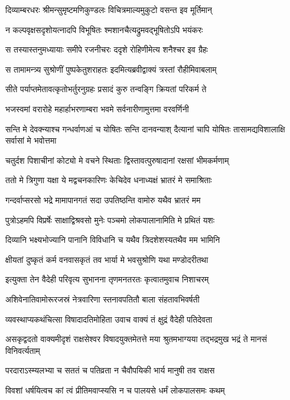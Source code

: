 \twolineshloka
{दिव्याम्बरधरः श्रीमन्सुमृष्टमणिकुण्डलः}
{विचित्रमाल्यमुकुटो वसन्त इव मूर्तिमान्}


\twolineshloka
{न कल्पवृक्षसदृशोयत्नादपि विभूषितः}
{श्मशानचैत्यद्रुमवद्भूषितोऽपि भयंकरः}


\twolineshloka
{स तस्यास्तनुमध्यायाः समीपे रजनीचरः}
{ददृशे रोहिणीमेत्य शनैश्चर इव ग्रैहः}


\twolineshloka
{स तामामन्त्र्य सुश्रोणीं पुष्पकेतुशराहतः}
{इदमित्यब्रवीद्वाक्यं त्रस्तां रौहीमिवाबलाम्}


\twolineshloka
{सीते पर्याप्तमेतावत्कृतोभर्तुरनुग्रहः}
{प्रसादं कुरु तन्वङ्गि क्रियतां परिकर्म ते}


\twolineshloka
{भजस्वमां वरारोहे महार्हाभरणाम्बरा}
{भवमे सर्वनारीणामुत्तमा वरवर्णिनी}


\threelineshloka
{सन्ति मे देवक्न्याश्च गन्धर्वाणआं च योषितः}
{सन्ति दानवन्याश् दैत्यानां चापि योषितः}
{तासामद्यविशालाक्षि सर्वासां मे भवोत्तमा}


\twolineshloka
{चतुर्दश पिशाचीनां कोट्यो मे वचने स्थिताः}
{द्विस्तावत्पुरुषादानां रक्षसां भीमकर्मणाम्}


\twolineshloka
{ततो मे त्रिगुणा यक्षा ये मद्वचनकारिणः}
{केचिदेव धनाध्यक्षं भ्रातरं मे समाश्रिताः}


\twolineshloka
{गन्दर्वाप्सरसो भद्रे मामापानगतं सदा}
{उपतिष्ठन्ति वामोरु यथैव भ्रातरं मम}


\twolineshloka
{पुत्रोऽहमपि विप्रर्षेः साक्षाद्विश्रवसो मुनेः}
{पञ्चमो लोकपालानामिति मे प्रथितं यशः}


\twolineshloka
{दिव्यानि भक्ष्यभोज्यानि पानानि विविधानि च}
{यथैव त्रिदशेशस्यतथैव मम भामिनि}


\twolineshloka
{क्षीयतां दुष्कृतं कर्म वनवासकृतं तव}
{भार्या मे भवसुश्रोणि यथा मण्डोदरीतथा}


\twolineshloka
{इत्युक्ता तेन वैदेही परिवृत्य सुभानना}
{तृणमनतरतः कृत्वातमुवाच निशाचरम्}


\twolineshloka
{अशिवेनातिवामोरूरजस्रं नेत्रवारिणा}
{स्तनावपतितौ बाला संहतावभिवर्षती}


\twolineshloka
{व्यवस्थाप्यकथंचित्सा विषादादतिमोहिता}
{उवाच वाक्यं तं क्षुद्रं वैदेही पतिदेवता}


\threelineshloka
{असकृद्वदतो वाक्यमीदृशं राक्षसेश्वर}
{विषादयुक्तमेतत्ते मया श्रुतमभाग्यया}
{तद्भद्रमुख भद्रं ते मानसं विनिवर्त्यताम्}


\twolineshloka
{परदाराऽस्म्यलभ्या च सततं च पतिव्रता}
{न चैवौपयिकी भार्य मानुषी तव राक्षस}


\twolineshloka
{विवशां धर्षयित्वच कां त्वं प्रीतिमवाप्स्यसि}
{न च पालयसे धर्मं लोकपालसमः कथम्}


